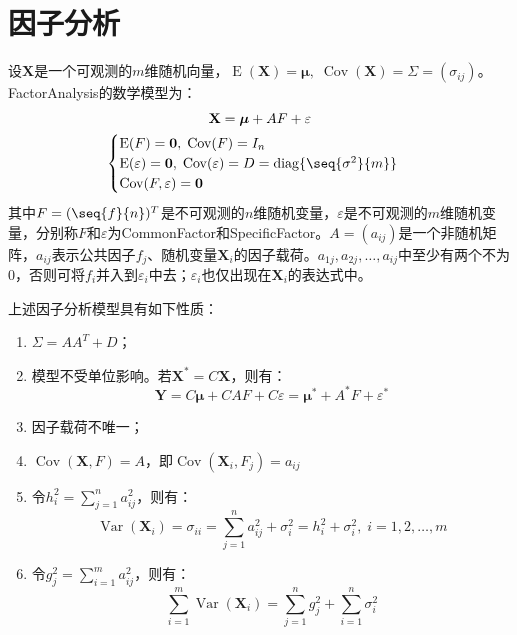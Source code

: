 \section{因子分析}

\begin{definition}
	设$\mathbf{X}$是一个可观测的$m$维随机向量，$\operatorname{E}(\mathbf{X})=\boldsymbol{\mu},\;\operatorname{Cov}(\mathbf{X})=\Sigma=(\sigma_{ij})$。\gls{FactorAnalysis}的数学模型为：
	\begin{gather*}
		\mathbf{X}=\boldsymbol{\mu}+AF+\varepsilon \\
		\begin{cases}
			\operatorname{E}(F)=\mathbf{0},\;\operatorname{Cov}(F)=I_n \\
			\operatorname{E}(\varepsilon)=\mathbf{0},\;\operatorname{Cov}(\varepsilon)=D=\operatorname{diag}\{\seq{\sigma^2}{m}\} \\
			\operatorname{Cov}(F,\varepsilon)=\mathbf{0}
		\end{cases}
	\end{gather*}
	其中$F=(\seq{f}{n})^T$是不可观测的$n$维随机变量，$\varepsilon$是不可观测的$m$维随机变量，分别称$F$和$\varepsilon$为\gls{CommonFactor}和\gls{SpecificFactor}。$A=(a_{ij})$是一个非随机矩阵，$a_{ij}$表示公共因子$f_j$、随机变量$\mathbf{X}_i$的因子载荷。$a_{1j},a_{2j},\dots,a_{ij}$中至少有两个不为$0$，否则可将$f_i$并入到$\varepsilon_i$中去；$\varepsilon_i$也仅出现在$\mathbf{X}_i$的表达式中。
\end{definition}
\begin{property}
	上述因子分析模型具有如下性质：
	\begin{enumerate}
		\item $\Sigma=AA^T+D$；
		\item 模型不受单位影响。若$\mathbf{X}^*=C\mathbf{X}$，则有：
		\begin{equation*}
			\mathbf{Y}=C\boldsymbol{\mu}+CAF+C\varepsilon=\boldsymbol{\mu}^*+A^*F+\varepsilon^*
		\end{equation*}
		\item 因子载荷不唯一；
		\item $\operatorname{Cov}(\mathbf{X},F)=A$，即$\operatorname{Cov}(\mathbf{X}_i,F_j)=a_{ij}$
		\item 令$h_i^2=\sum\limits_{j=1}^{n}a_{ij}^2$，则有：
		\begin{equation*}
			\operatorname{Var}(\mathbf{X}_i)=\sigma_{ii}=\sum_{j=1}^{n}a_{ij}^2+\sigma_i^2=h_i^2+\sigma_i^2,\;i=1,2,\dots,m
		\end{equation*}
		\item 令$g_j^2=\sum\limits_{i=1}^{m}a_{ij}^2$，则有：
		\begin{equation*}
			\sum_{i=1}^{m}\operatorname{Var}(\mathbf{X}_i)=\sum_{j=1}^{n}g_j^2+\sum_{i=1}^{n}\sigma_i^2
		\end{equation*}
	\end{enumerate}
\end{property}
